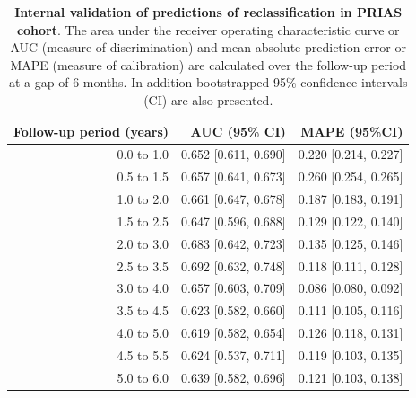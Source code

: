 \begin{table}[!htb]
\small\sf\centering
\caption{\textbf{Internal validation of predictions of reclassification in PRIAS cohort}. The area under the receiver operating characteristic curve or AUC (measure of discrimination) and mean absolute prediction error or MAPE (measure of calibration) are calculated over the follow-up period at a gap of 6 months. In addition bootstrapped 95\% confidence intervals (CI) are also presented.}
\label{tab:AUC_PE_PRIAS}
\begin{tabular}{r|r|r}
\hline
\hline
Follow-up period (years) & AUC (95\% CI) & MAPE (95\%CI)\\ 
\hline
0.0 to 1.0 & 0.652 [0.611, 0.690] & 0.220 [0.214, 0.227]\\
0.5 to 1.5 & 0.657 [0.641, 0.673] & 0.260 [0.254, 0.265]\\
1.0 to 2.0 & 0.661 [0.647, 0.678] & 0.187 [0.183, 0.191]\\
1.5 to 2.5 & 0.647 [0.596, 0.688] & 0.129 [0.122, 0.140]\\
2.0 to 3.0 & 0.683 [0.642, 0.723] & 0.135 [0.125, 0.146]\\
2.5 to 3.5 & 0.692 [0.632, 0.748] & 0.118 [0.111, 0.128]\\
3.0 to 4.0 & 0.657 [0.603, 0.709] & 0.086 [0.080, 0.092]\\
3.5 to 4.5 & 0.623 [0.582, 0.660] & 0.111 [0.105, 0.116]\\
4.0 to 5.0 & 0.619 [0.582, 0.654] & 0.126 [0.118, 0.131]\\
4.5 to 5.5 & 0.624 [0.537, 0.711] & 0.119 [0.103, 0.135]\\
5.0 to 6.0 & 0.639 [0.582, 0.696] & 0.121 [0.103, 0.138]\\
\hline
\end{tabular}	
\end{table}

